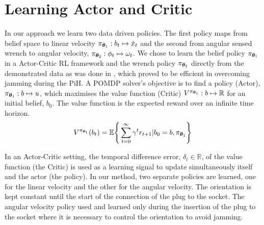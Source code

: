 

\section{Learning Actor and Critic}\label{ch4:learning-value-actor}

In our approach we learn two data driven policies. The first policy maps from belief space 
to linear velocity $\pi_{\boldsymbol{\theta}_1} : b_t \mapsto \dot{x}_t$ and the second from 
angular sensed wrench to angular velocity, $ \pi_{\boldsymbol{\theta}_2} : \phi_t \mapsto \omega_t$.
We chose to learn the belief policy $\pi_{\boldsymbol{\theta}_1}$ in a Actor-Critic RL framework 
and the wrench policy $\pi_{\boldsymbol{\theta}_2}$ directly from the demonstrated data as was done 
in \cite[Chap. 5]{Kronander2015}, which proved to be efficient in overcoming jamming during the PiH. 
A POMDP solver's objective is to find a policy (Actor), $\pi_{\boldsymbol{\theta}_1}: b \mapsto u$, which maximises 
the value function (Critic) $V^{\pi_{\boldsymbol{\theta}_1}} : b \mapsto \mathbb{R}$ for an initial belief, $b_{0}$. The value function
is the expected reward over an infinite time horizon.
\begin{equation}\label{eq:value_function}
  V^{\pi_{\boldsymbol{\theta}_1}}(b_t) = \mathbb{E}\Bigg\{ \sum_{t=0}^{\infty} \gamma^{t} r_{t+1} | b_0=b,\pi_{\boldsymbol{\theta}_1}\Bigg\}
\end{equation}

In an Actor-Critic setting, the temporal difference error, $\delta_t \in \mathbb{R}$, of the value function (the Critic) is 
used as a learning signal to update simultaneously itself and the actor (the policy). In our method, 
two separate policies are learned, one for the linear velocity and the other for the angular velocity.
The orientation is kept constant until the start of the connection of the plug to the socket.
The angular velocity policy used and learned only during the insertion of the plug to the socket where it is necessary
to control the orientation to avoid jamming.

